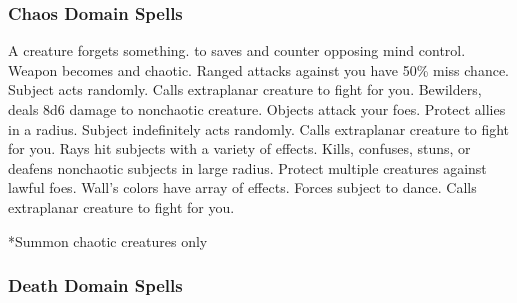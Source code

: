 \subsubsection{Chaos Domain Spells}

\begin{spelllist}
   A creature forgets something.
    to saves and counter opposing mind control.
   Weapon becomes  and chaotic.
   Ranged attacks against you have 50\% miss chance.
   Subject acts randomly.
   Calls extraplanar creature to fight for you.
   Bewilders, deals 8d6 damage to nonchaotic creature.
   Objects attack your foes.
   Protect allies in a \areamed radius.
   Subject indefinitely acts randomly.
   Calls extraplanar creature to fight for you.
   Rays hit subjects with a variety of effects.
   Kills, confuses, stuns, or deafens nonchaotic subjects in large radius.
  \F Protect multiple creatures against lawful foes. 
   Wall's colors have array of effects.
   Forces subject to dance.
   Calls extraplanar creature to fight for you.
\end{spelllist}
*Summon chaotic creatures only

\subsubsection{Death Domain Spells}


